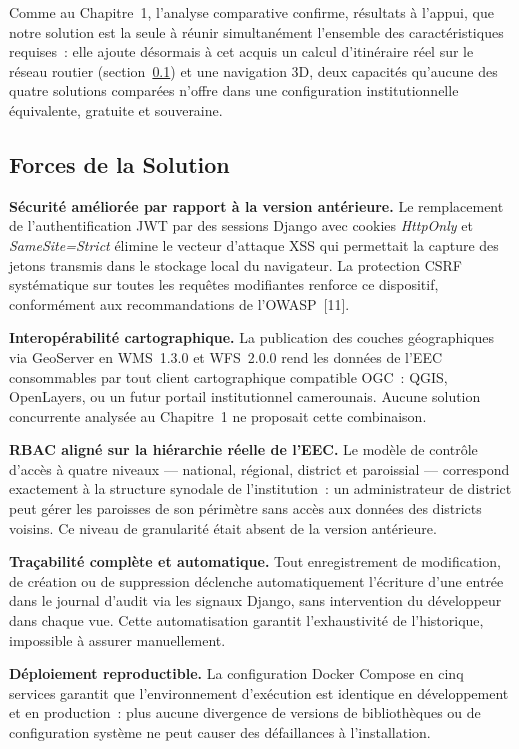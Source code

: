 \documentclass[12pt, a4paper]{report}
\begin{document}
Comme au Chapitre~1, l'analyse comparative confirme, résultats à l'appui, que
notre solution est la seule à réunir simultanément l'ensemble des
caractéristiques requises~: elle ajoute désormais à cet acquis un calcul
d'itinéraire réel sur le réseau routier (section~\ref{ssec:disc-forces}) et une
navigation 3D, deux capacités qu'aucune des quatre solutions comparées
n'offre dans une configuration institutionnelle équivalente, gratuite et
souveraine.

\subsection{Forces de la Solution}
\label{ssec:disc-forces}

\textbf{Sécurité améliorée par rapport à la version antérieure.}
Le remplacement de l'authentification JWT par des sessions Django avec
cookies \textit{HttpOnly} et \textit{SameSite=Strict} élimine le vecteur
d'attaque XSS qui permettait la capture des jetons transmis dans le stockage
local du navigateur. La protection CSRF systématique sur toutes les
requêtes modifiantes renforce ce dispositif, conformément aux recommandations
de l'OWASP~[11].

\textbf{Interopérabilité cartographique.}
La publication des couches géographiques via GeoServer en WMS~1.3.0 et
WFS~2.0.0 rend les données de l'EEC consommables par tout client
cartographique compatible OGC~: QGIS, OpenLayers, ou un futur portail
institutionnel camerounais. Aucune solution concurrente analysée au
Chapitre~1 ne proposait cette combinaison.

\textbf{RBAC aligné sur la hiérarchie réelle de l'EEC.}
Le modèle de contrôle d'accès à quatre niveaux --- national, régional,
district et paroissial --- correspond exactement à la structure synodale
de l'institution~: un administrateur de district peut gérer les paroisses
de son périmètre sans accès aux données des districts voisins. Ce niveau
de granularité était absent de la version antérieure.

\textbf{Traçabilité complète et automatique.}
Tout enregistrement de modification, de création ou de suppression
déclenche automatiquement l'écriture d'une entrée dans le journal d'audit
via les signaux Django, sans intervention du développeur dans chaque vue.
Cette automatisation garantit l'exhaustivité de l'historique, impossible
à assurer manuellement.

\textbf{Déploiement reproductible.}
La configuration Docker Compose en cinq services garantit que l'environnement
d'exécution est identique en développement et en production~: plus aucune
divergence de versions de bibliothèques ou de configuration système ne peut
causer des défaillances à l'installation.
\end{document}
